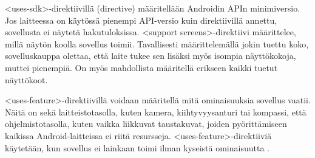 <uses-sdk>-direktiivillä (directive) määritellään Androidin APIn minimiversio. Jos laitteessa on käytössä pienempi API-versio kuin direktiivillä annettu, sovellusta ei näytetä hakutuloksissa. <support screens>-direktiivi määrittelee, millä näytön koolla sovellus toimii. Tavallisesti määrittelemällä jokin tuettu koko, sovelluskauppa olettaa, että laite tukee sen lisäksi myös isompia näyttökokoja, muttei pienempiä. On myös mahdollista määritellä erikseen kaikki tuetut näyttökoot.

<uses-feature>-direktiivillä voidaan määritellä mitä ominaisuuksia sovellus vaatii. Näitä on sekä laitteistotasolla, kuten kamera, kiihtyvyysanturi tai kompassi, että ohjelmistotasolla, kuten vaikka liikkuvat taustakuvat, joiden pyörittämiseen kaikissa Android-laitteissa ei riitä resursseja. <uses-feature>-direktiiviä käytetään, kun sovellus ei lainkaan toimi ilman kyseistä ominaisuutta \cite{android_compatibility}.
